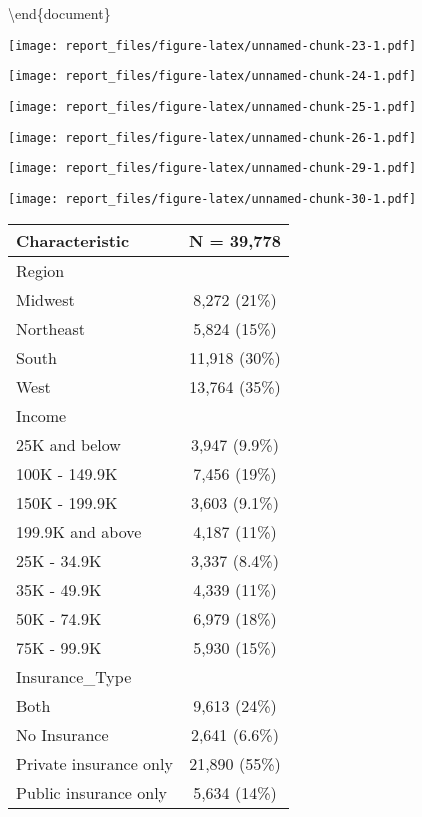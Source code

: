 \documentclass[
  12pt,
]{article}
\begin{document}
\textbackslash end\{document\}

\texttt{[image: report\_files/figure-latex/unnamed-chunk-23-1.pdf]}

\texttt{[image: report\_files/figure-latex/unnamed-chunk-24-1.pdf]}

\texttt{[image: report\_files/figure-latex/unnamed-chunk-25-1.pdf]}

\texttt{[image: report\_files/figure-latex/unnamed-chunk-26-1.pdf]}

\texttt{[image: report\_files/figure-latex/unnamed-chunk-29-1.pdf]}

\texttt{[image: report\_files/figure-latex/unnamed-chunk-30-1.pdf]}

\begin{longtable}[]{@{}lc@{}}
\toprule()
\textbf{Characteristic} & \textbf{N = 39,778} \\
\midrule()
\endhead
Region & \\
Midwest & 8,272 (21\%) \\
Northeast & 5,824 (15\%) \\
South & 11,918 (30\%) \\
West & 13,764 (35\%) \\
Income & \\
25K and below & 3,947 (9.9\%) \\
100K - 149.9K & 7,456 (19\%) \\
150K - 199.9K & 3,603 (9.1\%) \\
199.9K and above & 4,187 (11\%) \\
25K - 34.9K & 3,337 (8.4\%) \\
35K - 49.9K & 4,339 (11\%) \\
50K - 74.9K & 6,979 (18\%) \\
75K - 99.9K & 5,930 (15\%) \\
Insurance\_Type & \\
Both & 9,613 (24\%) \\
No Insurance & 2,641 (6.6\%) \\
Private insurance only & 21,890 (55\%) \\
Public insurance only & 5,634 (14\%) \\
\bottomrule()
\end{longtable}
\end{document}
